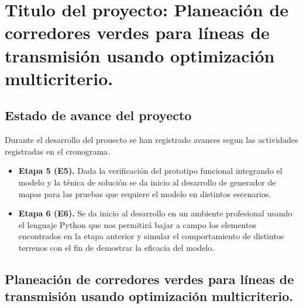 \documentclass[
  letterpaper,
  DIV=11,
  numbers=noendperiod]{scrartcl}
\author{}
\date{}
\providecommand{\tightlist}{%
  \setlength{\itemsep}{0pt}\setlength{\parskip}{0pt}}\usepackage{longtable,booktabs,array}
\begin{document}
\ifdefined\Shaded\renewenvironment{Shaded}{\begin{tcolorbox}[frame hidden, boxrule=0pt, borderline west={3pt}{0pt}{shadecolor}, interior hidden, enhanced, breakable, sharp corners]}{\end{tcolorbox}}\fi

\hypertarget{titulo-del-proyecto-planeaciuxf3n-de-corredores-verdes-para-luxedneas-de-transmisiuxf3n-usando-optimizaciuxf3n-multicriterio.}{%
\section{Titulo del proyecto: Planeación de corredores verdes para
líneas de transmisión usando optimización
multicriterio.}\label{titulo-del-proyecto-planeaciuxf3n-de-corredores-verdes-para-luxedneas-de-transmisiuxf3n-usando-optimizaciuxf3n-multicriterio.}}

\hypertarget{estado-de-avance-del-proyecto}{%
\subsection{Estado de avance del
proyecto}\label{estado-de-avance-del-proyecto}}

Durante el desarrollo del prouecto se han registrado avances segun las
actividades registradas en el cronograma.

\begin{itemize}
\tightlist
\item
  \textbf{Etapa 5 (E5).} Dada la verificación del prototipo funcional
  integrando el modelo y la ténica de solución se da inicio al
  desarrollo de generador de mapas para las pruebas que requiere el
  modelo en distintos escenarios.
\item
  \textbf{Etapa 6 (E6).} Se da inicio al desarrollo en un ambiente
  profesional usando el lenguaje Python que nos permitirá bajar a campo
  los elementos encontrados en la etapa anterior y simular el
  comportamiento de distintos terrenos con el fin de demostrar la
  eficacia del modelo.
\end{itemize}

\hypertarget{planeaciuxf3n-de-corredores-verdes-para-luxedneas-de-transmisiuxf3n-usando-optimizaciuxf3n-multicriterio.}{%
\subsection{Planeación de corredores verdes para líneas de transmisión
usando optimización
multicriterio.}\label{planeaciuxf3n-de-corredores-verdes-para-luxedneas-de-transmisiuxf3n-usando-optimizaciuxf3n-multicriterio.}}
\end{document}
